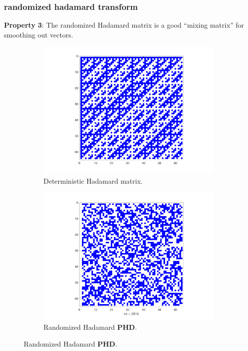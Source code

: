 \documentclass[compress]{beamer}
\newcommand{\bv}[1]{\mathbf{#1}}
\begin{document}
\begin{frame}
	\frametitle{randomized hadamard transform}
	\textbf{Property 3}: The randomized Hadamard matrix is a good ``mixing matrix'' for smoothing out vectors. 
	
	\begin{figure}[h]
		\centering
		\begin{subfigure}[t]{0.3\textwidth}
			\centering
			\includegraphics[width=\textwidth]{hadamard.png}
			\caption{Deterministic Hadamard matrix.}
		\end{subfigure}
		\begin{subfigure}[t]{0.3\textwidth}
			\centering
			\includegraphics[width=\textwidth]{randomizedHadamard.png}
			\caption{Randomized Hadamard $\bv{PHD}$.}

\end{subfigure}
\end{figure}
\end{frame}
\end{document}
